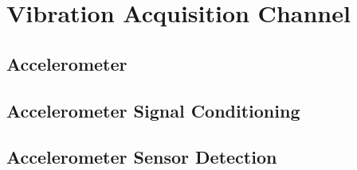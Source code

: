 \section{Vibration Acquisition Channel}

\subsection{Accelerometer}

\subsection{Accelerometer Signal Conditioning}

\subsection{Accelerometer Sensor Detection}
			

